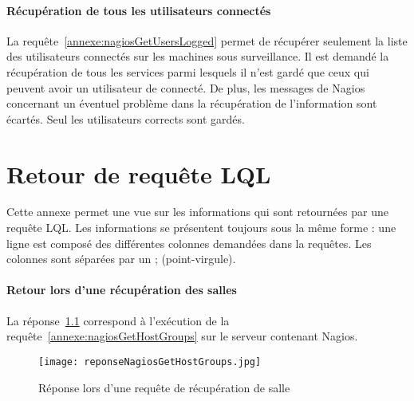\begin{appendices}
\clearpage


\label{annexe:nagiosGetResources}

\subsubsection{R\'ecup\'eration de tous les utilisateurs connect\'es}

La requ\^ete~\ref{annexe:nagiosGetUsersLogged} permet de r\'ecup\'erer seulement la liste des utilisateurs connect\'es sur les machines sous surveillance.
Il est demand\'e la r\'ecup\'eration de tous les services parmi lesquels il n'est gard\'e que ceux qui peuvent avoir un utilisateur de connect\'e.
De plus, les messages de Nagios concernant un \'eventuel probl\`eme dans la r\'ecup\'eration de l'information sont \'ecart\'es.
Seul les utilisateurs \og corrects\fg{} sont gard\'es.

\vspace{0.20cm}


\label{annexe:nagiosGetUsersLogged}

\chapter{Retour de requ\^ete LQL}
\label{annexe:reponseLQLNagios}

Cette annexe permet une vue sur les informations qui sont retourn\'ees par une requ\^ete LQL.
Les informations se pr\'esentent toujours sous la m\^eme forme : une ligne est compos\'e des diff\'erentes colonnes demand\'ees dans la requ\^etes.
Les colonnes sont s\'epar\'ees par un \textsf{; (point-virgule)}.

\subsubsection{Retour lors d'une r\'ecup\'eration des salles}

La r\'eponse~\ref{annexe:reponseNagiosGetHostGroups} correspond \`a l'ex\'ecution de la requ\^ete~\ref{annexe:nagiosGetHostGroups} sur le serveur contenant Nagios.

\begin{figure}[!ht]
	\centering
	\texttt{[image: reponseNagiosGetHostGroups.jpg]}
	\caption{R\'eponse lors d'une requ\^ete de r\'ecup\'eration de salle}
	\label{annexe:reponseNagiosGetHostGroups}


\end{figure}
\end{appendices}
